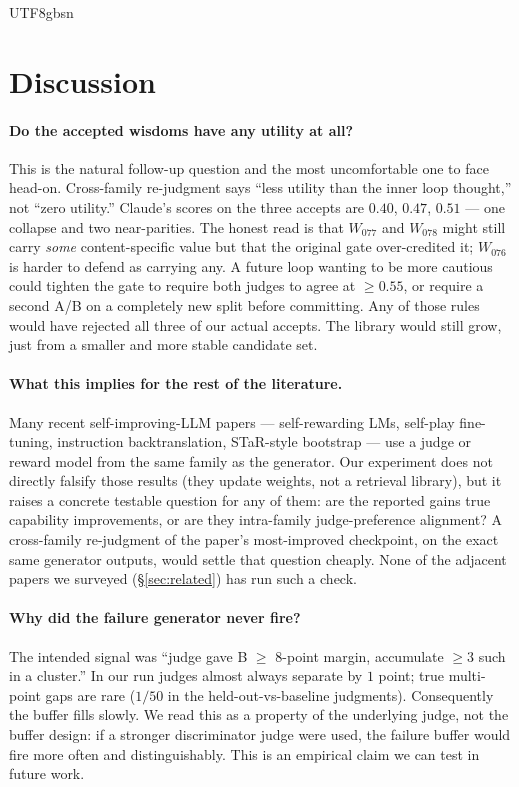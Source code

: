 \documentclass{article}
\begin{document}
\begin{CJK*}{UTF8}{gbsn}
\section{Discussion}
\label{sec:discussion}

\paragraph{Do the accepted wisdoms have any utility at all?}
This is the natural follow-up question and the most uncomfortable
one to face head-on. Cross-family re-judgment says ``less utility
than the inner loop thought,'' not ``zero utility.'' Claude's
scores on the three accepts are \(0.40\), \(0.47\), \(0.51\) ---
one collapse and two near-parities. The honest read is that
\(W_{077}\) and \(W_{078}\) might still carry \emph{some}
content-specific value but that the original gate over-credited
it; \(W_{076}\) is harder to defend as carrying any. A future
loop wanting to be more cautious could tighten the gate to
require both judges to agree at \(\geq 0.55\), or require a
second A/B on a completely new split before committing. Any of
those rules would have rejected all three of our actual accepts.
The library would still grow, just from a smaller and more
stable candidate set.

\paragraph{What this implies for the rest of the literature.}
Many recent self-improving-LLM papers --- self-rewarding LMs,
self-play fine-tuning, instruction backtranslation, STaR-style
bootstrap --- use a judge or reward model from the same family
as the generator. Our experiment does not directly falsify those
results (they update weights, not a retrieval library), but it
raises a concrete testable question for any of them: are the
reported gains true capability improvements, or are they
intra-family judge-preference alignment? A cross-family
re-judgment of the paper's most-improved checkpoint, on the
exact same generator outputs, would settle that question
cheaply. None of the adjacent papers we surveyed
(\S\ref{sec:related}) has run such a check.

\paragraph{Why did the failure generator never fire?} The intended
signal was ``judge gave B \(\geq\) 8-point margin, accumulate
\(\geq 3\) such in a cluster.'' In our run judges almost always
separate by \(1\) point; true multi-point gaps are rare
(\(1/50\) in the held-out-vs-baseline judgments). Consequently the
buffer fills slowly. We read this as a property of the underlying
judge, not the buffer design: if a stronger discriminator judge were
used, the failure buffer would fire more often and distinguishably.
This is an empirical claim we can test in future work.


\end{CJK*}
\end{document}
